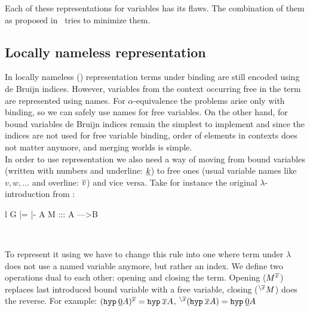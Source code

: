 Each of these representations for variables has its flaws. The combination of them as proposed in~\cite{charg08} tries to minimize them.

\subsection{Locally nameless representation}
In locally nameless (\LN{}) representation terms under binding are still encoded using de Bruijn indices. However, variables from the context occurring free in the term are represented using names. For $\alpha$-equivalence the problems arise only with binding, so we can safely use names for free variables. On the other hand, for bound variables de Bruijn indices remain the simplest to implement and since the indices are not used for free variable binding, order of elements in contexts does not matter anymore, and merging worlds is simple.\\

In order to use \LN{} representation we also need a way of moving from bound variables (written with numbers and underline: $\underline{k}$) to free ones (usual variable names like $v, w, \dots$ and overline: $\overline{v}$) and vice versa. Take for instance the original $\lambda$-introduction from \langLF{}:

\begin{center}
\footnotesize
\begin{tabular}{ l }
			    {G |= \Gamma |-  A M ::: A --->B}
\end{tabular}\\
\normalsize
\end{center}

To represent it using \LN{} we have to change this rule into one where term under $\lambda$ does not use a named variable anymore, but rather an index. We define two operations dual to each other: opening and closing the term. Opening ($M^{\overline{x}}$) replaces last introduced bound variable with a free variable, closing (${}^ {\backslash{\overline{x}}} M$) does the reverse. For example:
$(\mbox{$\operatorname{\texttt{hyp}}_{} {\underline{0}}$}A)^{\overline{x}} = \mbox{$\operatorname{\texttt{hyp}}_{} {\overline{x}}$}A$, ${}^ {\backslash{\overline{x}}} (\mbox{$\operatorname{\texttt{hyp}}_{} {\overline{x}}$}A) = \mbox{$\operatorname{\texttt{hyp}}_{} {\underline{0}}$}A$

